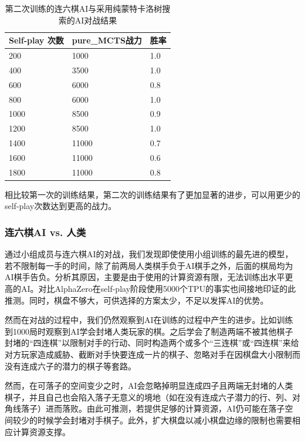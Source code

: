 \documentclass[c5size]{ctexart}
\begin{document}
			\begin{table}[!htbp]
				\centering
				\caption{第二次训练的连六棋AI与采用纯蒙特卡洛树搜索的AI对战结果}
				\label{table:train_result2}
				\begin{tabular}{lll}
					\toprule
					Self-play 次数 & pure\_MCTS战力 &胜率 \\
					\midrule
					200         & 1000             & 1.0 \\
					400         & 3500             & 1.0 \\
					600         & 6000             & 0.8 \\
					800         & 6000             & 1.0 \\
					1000        & 8500             & 0.9 \\
					1200        & 8500             & 1.0 \\
					1400        & 11000            & 0.7 \\
					1600        & 11000            & 0.6 \\
					1800        & 11000            & 0.8\\
					\bottomrule
				\end{tabular}
			\end{table}
		相比较第一次的训练结果，第二次的训练结果有了更加显著的进步，可以用更少的self-play次数达到更高的战力。
	\subsubsection{连六棋AI vs. 人类}
		通过小组成员与连六棋AI的对战，我们发现即使使用小组训练的最先进的模型，若不限制每一手的时间，除了前两局人类棋手负于AI棋手之外，后面的棋局均为AI棋手告负。分析其原因，主要是由于使用的计算资源有限，无法训练出水平更高的AI。对比AlphaZero在self-play阶段使用5000个TPU的事实也间接地印证的此推测。同时，棋盘不够大，可供选择的方案太少，不足以发挥AI的优势。\par
		然而在对战的过程中，我们仍然观察到AI在训练的过程中产生的进步。比如训练到1000局时观察到AI学会封堵人类玩家的棋。之后学会了制造两端不被其他棋子封堵的“四连棋”以限制对手的行动、同时构造两个或多个“三连棋”或“四连棋”来给对方玩家造成威胁、截断对手快要连成一片的棋子、忽略对手在因棋盘大小限制而没有连成六子的潜力的棋子等套路。\par
		然而，在可落子的空间变少之时，AI会忽略掉明显连成四子且两端无封堵的人类棋子，并且自己也会陷入落子无意义的境地（如在没有连成六子潜力的行、列、对角线落子）进而落败。由此可推测，若提供足够的计算资源，AI仍可能在落子空间较少的时候学会封堵对手棋子。此外，扩大棋盘以减小棋盘边缘的限制也需要相应计算资源支撑。 
		
\end{document}
